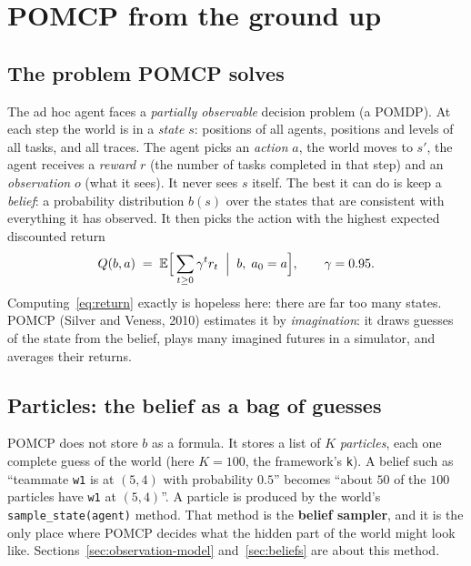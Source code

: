 \documentclass[11pt,a4paper]{article}
\newcommand{\code}[1]{\texttt{#1}}
\theoremstyle{remark}
\begin{document}
\section{POMCP from the ground up}
\label{sec:pomcp}

\subsection{The problem POMCP solves}

The ad hoc agent faces a \emph{partially observable} decision problem (a POMDP). At each step the world is in a
\emph{state} $s$: positions of all agents, positions and levels of all tasks, and all traces. The agent picks an
\emph{action} $a$, the world moves to $s'$, the agent receives a \emph{reward} $r$ (the number of tasks completed in that
step) and an \emph{observation} $o$ (what it sees). It never sees $s$ itself. The best it can do is keep a
\emph{belief}: a probability distribution $b(s)$ over the states that are consistent with everything it has observed.
It then picks the action with the highest expected discounted return
\begin{equation}
  Q(b,a) \;=\; \mathbb E\Bigl[\,\sum_{t\ge 0} \gamma^{t} r_t \;\Bigm|\; b,\; a_0=a\Bigr], \qquad \gamma = 0.95 .
  \label{eq:return}
\end{equation}
Computing~\eqref{eq:return} exactly is hopeless here: there are far too many states. POMCP (Silver and Veness, 2010)
estimates it by \emph{imagination}: it draws guesses of the state from the belief, plays many imagined futures in a
simulator, and averages their returns.

\subsection{Particles: the belief as a bag of guesses}

POMCP does not store $b$ as a formula. It stores a list of $K$ \emph{particles}, each one complete guess of the world (here
$K=100$, the framework's \code{k}). A belief such as ``teammate \code{w1} is at $(5,4)$ with probability $0.5$'' becomes
``about $50$ of the $100$ particles have \code{w1} at $(5,4)$''. A particle is produced by the world's
\code{sample\_state(agent)} method. That method is the \textbf{belief sampler}, and it is the only place where POMCP
decides what the hidden part of the world might look like. Sections~\ref{sec:observation-model} and~\ref{sec:beliefs}
are about this method.
\end{document}
